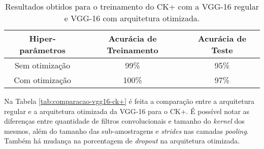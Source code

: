 \documentclass[
12pt,       %
openright,      %
oneside,      %
a4paper,      %
english,      %
french,       %
spanish,      %
brazil        %
]{abntex2}
\begin{document}
\begin{table}[H]
\centering
\caption{Resultados obtidos para o treinamento do CK+ com a VGG-16 regular e VGG-16 com arquitetura otimizada.}
\label{tab:resultados-ck+}
\begin{tabular}{@{}ccc@{}}
\toprule
\textbf{Hiper-parâmetros} & \textbf{Acurácia de Treinamento} & \textbf{Acurácia de Teste} \\ \midrule
Sem otimização            & 99\%              & 95\%               \\
Com otimização            & 100\%             & 97\%               \\ \bottomrule
\end{tabular}
\end{table}

Na Tabela \ref{tab:comparacao-vgg16-ck+} é feita a comparação entre a arquitetura regular e a arquitetura otimizada da VGG-16 para o CK+. É possível notar as diferenças entre quantidade de filtros convolucionais e tamanho do \textit{kernel} dos mesmos, além do tamanho das sub-amostragens e \textit{strides} nas camadas \textit{pooling}. Também há mudança na porcentagem de \textit{dropout} na arquitetura otimizada.
\end{document}
